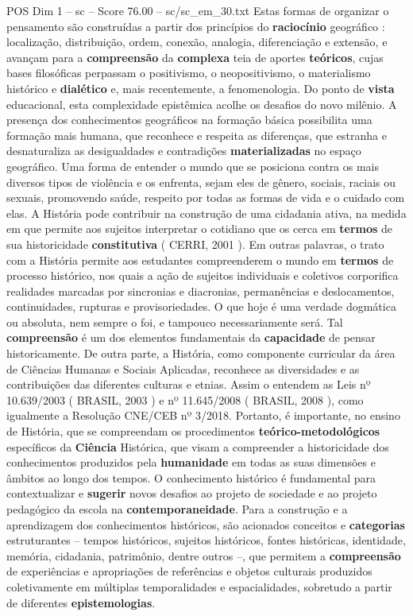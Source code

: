 \begin{textsample}{POS Dim 1 – sc – Score 76.00 – sc/sc\_em\_30.txt}
Estas formas de organizar o pensamento são construídas a partir dos princípios do \textbf{raciocínio} geográfico : localização, distribuição, ordem, conexão, analogia, diferenciação e extensão, e avançam para a \textbf{compreensão} da \textbf{complexa} teia de aportes \textbf{teóricos}, cujas bases filosóficas perpassam o positivismo, o neopositivismo, o materialismo histórico e \textbf{dialético} e, mais recentemente, a fenomenologia.
Do ponto de \textbf{vista} educacional, esta complexidade epistêmica acolhe os desafios do novo milênio.
A presença dos conhecimentos geográficos na formação básica possibilita uma formação mais humana, que reconhece e respeita as diferenças, que estranha e desnaturaliza as desigualdades e contradições \textbf{materializadas} no espaço geográfico.
Uma forma de entender o mundo que se posiciona contra os mais diversos tipos de violência e os enfrenta, sejam eles de gênero, sociais, raciais ou sexuais, promovendo saúde, respeito por todas as formas de vida e o cuidado com elas.
A História pode contribuir na construção de uma cidadania ativa, na medida em que permite aos sujeitos interpretar o cotidiano que os cerca em \textbf{termos} de sua historicidade \textbf{constitutiva} ( CERRI, 2001 ).
Em outras palavras, o trato com a História permite aos estudantes compreenderem o mundo em \textbf{termos} de processo histórico, nos quais a ação de sujeitos individuais e coletivos corporifica realidades marcadas por sincronias e diacronias, permanências e deslocamentos, continuidades, rupturas e provisoriedades.
O que hoje é uma verdade dogmática ou absoluta, nem sempre o foi, e tampouco necessariamente será.
Tal \textbf{compreensão} é um dos elementos fundamentais da \textbf{capacidade} de pensar historicamente.
De outra parte, a História, como componente curricular da área de Ciências Humanas e Sociais Aplicadas, reconhece as diversidades e as contribuições das diferentes culturas e etnias.
Assim o entendem as Leis nº 10.639/2003 ( BRASIL, 2003 ) e nº 11.645/2008 ( BRASIL, 2008 ), como igualmente a Resolução CNE/CEB nº 3/2018.
Portanto, é importante, no ensino de História, que se compreendam os procedimentos \textbf{teórico-metodológicos} específicos da \textbf{Ciência} Histórica, que visam a compreender a historicidade dos conhecimentos produzidos pela \textbf{humanidade} em todas as suas dimensões e âmbitos ao longo dos tempos.
O conhecimento histórico é fundamental para contextualizar e \textbf{sugerir} novos desafios ao projeto de sociedade e ao projeto pedagógico da escola na \textbf{contemporaneidade}.
Para a construção e a aprendizagem dos conhecimentos históricos, são acionados conceitos e \textbf{categorias} estruturantes – tempos históricos, sujeitos históricos, fontes históricas, identidade, memória, cidadania, patrimônio, dentre outros –, que permitem a \textbf{compreensão} de experiências e apropriações de referências e objetos culturais produzidos coletivamente em múltiplas temporalidades e espacialidades, sobretudo a partir de diferentes \textbf{epistemologias}.

\end{textsample}
